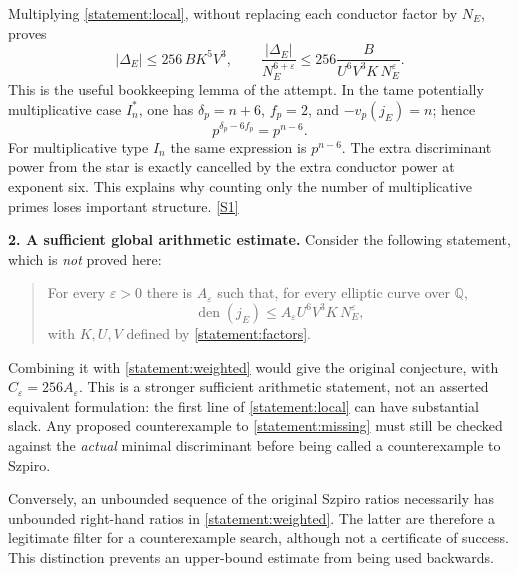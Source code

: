 \documentclass[11pt,a4paper]{article}
\newcommand{\Q}{\mathbb{Q}}
\newcommand{\sref}[2]{\hyperlink{source:#1:#2}{[S#2]}}
\numberwithin{equation}{section}
\begin{document}
Multiplying \eqref{statement:local}, without replacing each conductor factor by
$N_E$, proves
\begin{equation}\label{statement:weighted}
 |\Delta_E|\leq 256\,B K^5V^3,
 \qquad
 \frac{|\Delta_E|}{N_E^{6+\varepsilon}}
 \leq256\frac{B}{U^6V^3K\,N_E^\varepsilon}.
\end{equation}
This is the useful bookkeeping lemma of the attempt. In the tame
potentially multiplicative case $I_n^*$, one has
$\delta_p=n+6$, $f_p=2$, and $-v_p(j_E)=n$; hence
\[
 p^{\delta_p-6f_p}=p^{n-6}.
\]
For multiplicative type $I_n$ the same expression is $p^{n-6}$.
The extra discriminant power from the star is exactly cancelled by the
extra conductor power at exponent six. This explains why counting only the
number of multiplicative primes loses important structure.
\sref{statement}{1}

\medskip
\textbf{2. A sufficient global arithmetic estimate.}
Consider the following statement, which is \emph{not} proved here:
\begin{quote}
For every $\varepsilon>0$ there is $A_\varepsilon$ such that, for every
elliptic curve over $\Q$,
\begin{equation}\label{statement:missing}
 \operatorname{den}(j_E)\leq
 A_\varepsilon U^6V^3K\,N_E^\varepsilon,
\end{equation}
with $K,U,V$ defined by \eqref{statement:factors}.
\end{quote}
Combining it with \eqref{statement:weighted} would give the original conjecture,
with $C_\varepsilon=256A_\varepsilon$. This is a stronger sufficient
arithmetic statement, not an asserted equivalent formulation: the first
line of \eqref{statement:local} can have substantial slack. Any proposed
counterexample to \eqref{statement:missing} must still be checked against the
\emph{actual} minimal discriminant before being called a counterexample to
Szpiro.

Conversely, an unbounded sequence of the original Szpiro ratios necessarily
has unbounded right-hand ratios in \eqref{statement:weighted}. The latter are
therefore a legitimate filter for a counterexample search, although not a
certificate of success. This distinction prevents an upper-bound estimate
from being used backwards.
\end{document}
